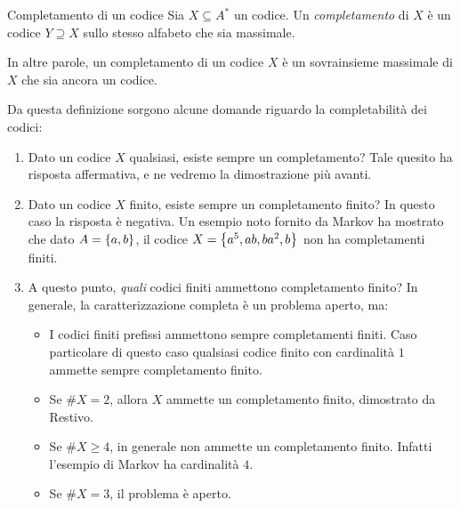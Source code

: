 \begin{definition}{Completamento di un codice}
  Sia \(X \subseteq A^*\) un codice.
  Un \emph{completamento} di \(X\) è un codice \(Y \supseteq X\) sullo stesso alfabeto che sia massimale.

  In altre parole, un completamento di un codice \(X\) è un sovrainsieme massimale di \(X\) che sia ancora un codice.
\end{definition}
Da questa definizione sorgono alcune domande riguardo la completabilità dei codici:
\begin{enumerate}
  \item Dato un codice \(X\) qualsiasi, esiste sempre un completamento?
    Tale quesito ha risposta affermativa, e ne vedremo la dimostrazione più avanti.
  \item Dato un codice \(X\) finito, esiste sempre un completamento finito?
    In questo caso la risposta è negativa.
    Un esempio noto fornito da Markov ha mostrato che dato \(A = \set{a,b}\), il codice \(X = \set{a^5,ab,ba^2,b}\) non ha completamenti finiti.
  \item A questo punto, \emph{quali} codici finiti ammettono completamento finito?
    In generale, la caratterizzazione completa è un problema aperto, ma:
    \begin{itemize}
      \item I codici finiti prefissi ammettono sempre completamenti finiti.
        Caso particolare di questo caso qualsiasi codice finito con cardinalità \(1\) ammette sempre completamento finito.
      \item Se \(\#X = 2\), allora \(X\) ammette un completamento finito, dimostrato da Restivo.
      \item Se \(\#X \geq 4\), in generale non ammette un completamento finito. Infatti l'esempio di Markov ha cardinalità \(4\).
      \item Se \(\#X = 3\), il problema è aperto.
    \end{itemize}
\end{enumerate}


